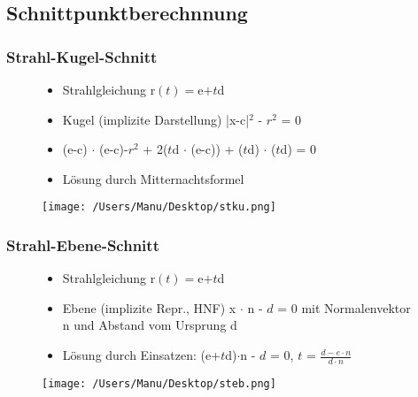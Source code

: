 \documentclass[paper=a4, fontsize=11pt]{scrartcl} %
\numberwithin{equation}{section} %
\numberwithin{figure}{section} %
\numberwithin{table}{section} %
\begin{document}
\subsection{Schnittpunktberechnnung}

\subsubsection{Strahl-Kugel-Schnitt}

\begin{figure}[htbp]
\begin{minipage}[t]{10cm}
\vspace{0pt}
\begin{itemize}
\item Strahlgleichung r$(t) = $e$ + t $d
\item Kugel (implizite Darstellung) |x-c|$^2$ - $r^2$ = 0
\item (e-c) $\cdot$ (e-c)-$r^2$ + 2($t$d $\cdot$ (e-c)) + ($t$d) $\cdot$ ($t$d) = 0
\item Lösung durch Mitternachtsformel
\end{itemize}
\end{minipage}
\hfill
\begin{minipage}[t]{4cm}
\vspace{0pt}
\centering
\texttt{[image: /Users/Manu/Desktop/stku.png]}
\end{minipage}
\end{figure}
\newpage
\subsubsection{Strahl-Ebene-Schnitt}

\begin{figure}[htbp]
\begin{minipage}[t]{10cm}
\vspace{0pt}
\begin{itemize}
\item Strahlgleichung r$(t) = $e$ + t $d
\item Ebene (implizite Repr., HNF) x $\cdot$ n - $d$ = 0 mit Normalenvektor n und Abstand vom Ursprung d
\item Lösung durch Einsatzen: (e+$t$d)$\cdot$n - $d$ = 0, $t$ = $\frac{d-e\cdot n}{d\cdot n}$
\end{itemize}
\end{minipage}
\hfill
\begin{minipage}[t]{4cm}
\vspace{0pt}
\centering
\texttt{[image: /Users/Manu/Desktop/steb.png]}
\end{minipage}
\end{figure}
\end{document}
